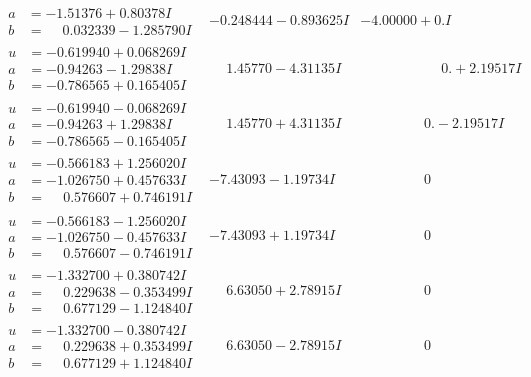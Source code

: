 \documentclass[1p]{elsarticle_modified}
\theoremstyle{definition}
\begin{document}
$$\begin{array}{c|c|c}
\begin{aligned}
a &= -1.51376 + 0.80378 I \\
b &= \phantom{-}0.032339 - 1.285790 I\end{aligned}
 & -0.248444 - 0.893625 I & -4.00000 + 0. I\phantom{ +0.000000I} \\ \hline\begin{aligned}
u &= -0.619940 + 0.068269 I \\
a &= -0.94263 - 1.29838 I \\
b &= -0.786565 + 0.165405 I\end{aligned}
 & \phantom{-}1.45770 - 4.31135 I & \phantom{-0.000000 -}0. + 2.19517 I \\ \hline\begin{aligned}
u &= -0.619940 - 0.068269 I \\
a &= -0.94263 + 1.29838 I \\
b &= -0.786565 - 0.165405 I\end{aligned}
 & \phantom{-}1.45770 + 4.31135 I & \phantom{-0.000000 } 0. - 2.19517 I \\ \hline\begin{aligned}
u &= -0.566183 + 1.256020 I \\
a &= -1.026750 + 0.457633 I \\
b &= \phantom{-}0.576607 + 0.746191 I\end{aligned}
 & -7.43093 - 1.19734 I & \phantom{-0.000000 } 0 \\ \hline\begin{aligned}
u &= -0.566183 - 1.256020 I \\
a &= -1.026750 - 0.457633 I \\
b &= \phantom{-}0.576607 - 0.746191 I\end{aligned}
 & -7.43093 + 1.19734 I & \phantom{-0.000000 } 0 \\ \hline\begin{aligned}
u &= -1.332700 + 0.380742 I \\
a &= \phantom{-}0.229638 - 0.353499 I \\
b &= \phantom{-}0.677129 - 1.124840 I\end{aligned}
 & \phantom{-}6.63050 + 2.78915 I & \phantom{-0.000000 } 0 \\ \hline\begin{aligned}
u &= -1.332700 - 0.380742 I \\
a &= \phantom{-}0.229638 + 0.353499 I \\
b &= \phantom{-}0.677129 + 1.124840 I\end{aligned}
 & \phantom{-}6.63050 - 2.78915 I & \phantom{-0.000000 } 0 \\ \hline\begin{aligned}

\end{aligned}
\end{array}$$
\end{document}
